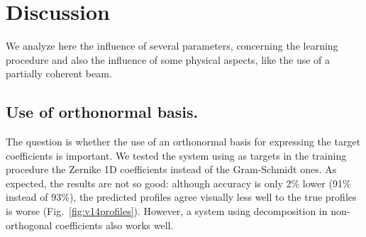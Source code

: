 \documentclass{iucr}
\begin{document}
\section{Discussion}\label{sec:discussion}

We analyze here the influence of several parameters, concerning the learning procedure and also the influence of some physical aspects, like the use of a partially coherent beam.

\subsection{Use of orthonormal basis.} The question is whether the use of an orthonormal basis for expressing the target coefficients is important. We tested the system using as targets in the training procedure the Zernike 1D coefficients instead of the Gram-Schmidt ones. As expected, the results are not so good: although 
accuracy is only 2\% lower (91\% instead of 93\%), the predicted profiles agree visually less well to the true profiles is worse (Fig.~\ref{fig:v14profiles}). However, a system using decomposition in non-orthogonal coefficients also works well. 
\end{document}

